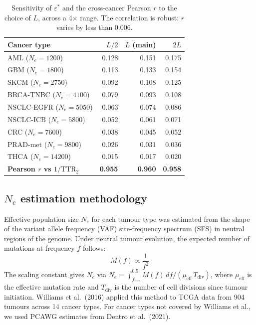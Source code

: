 \documentclass[12pt]{article}
\theoremstyle{remark}
\begin{document}
\begin{table}[ht]
\centering
\caption{Sensitivity of $\varepsilon^*$ and the cross-cancer Pearson $r$ to the choice of $L$, across a 4$\times$ range. The correlation is robust: $r$ varies by less than 0.006.}
\label{tab:s3}
\small
\begin{tabular}{@{}lrrr@{}}
\toprule
Cancer type & $L/2$ & $L$ (main) & $2L$ \\
\midrule
AML ($N_e=1200$)        & 0.128 & 0.151 & 0.175 \\
GBM ($N_e=1800$)        & 0.113 & 0.133 & 0.154 \\
SKCM ($N_e=2750$)       & 0.092 & 0.108 & 0.125 \\
BRCA-TNBC ($N_e=4100$)  & 0.079 & 0.093 & 0.108 \\
NSCLC-EGFR ($N_e=5050$) & 0.063 & 0.074 & 0.086 \\
NSCLC-ICB ($N_e=5800$)  & 0.052 & 0.061 & 0.071 \\
CRC ($N_e=7600$)        & 0.038 & 0.045 & 0.052 \\
PRAD-met ($N_e=9800$)   & 0.026 & 0.031 & 0.036 \\
THCA ($N_e=14200$)      & 0.015 & 0.017 & 0.020 \\
\midrule
\textbf{Pearson $r$ vs $1/\mathrm{TTR}_2$} & \textbf{0.955} & \textbf{0.960} & \textbf{0.958} \\
\bottomrule
\end{tabular}
\end{table}

\subsection{$N_e$ estimation methodology}

Effective population size $N_e$ for each tumour type was estimated from the shape of the variant allele frequency (VAF) site-frequency spectrum (SFS) in neutral regions of the genome. Under neutral tumour evolution, the expected number of mutations at frequency $f$ follows:
\[
  M(f) \propto \frac{1}{f^2}
\]
The scaling constant gives $N_e$ via $N_e = \int_{f_\text{min}}^{0.5} M(f)\,df / (\mu_\text{eff}\,T_\text{div})$, where $\mu_\text{eff}$ is the effective mutation rate and $T_\text{div}$ is the number of cell divisions since tumour initiation. Williams et al.\ (2016) applied this method to TCGA data from 904 tumours across 14 cancer types. For cancer types not covered by Williams et al., we used PCAWG estimates from Dentro et al.\ (2021).
\end{document}
